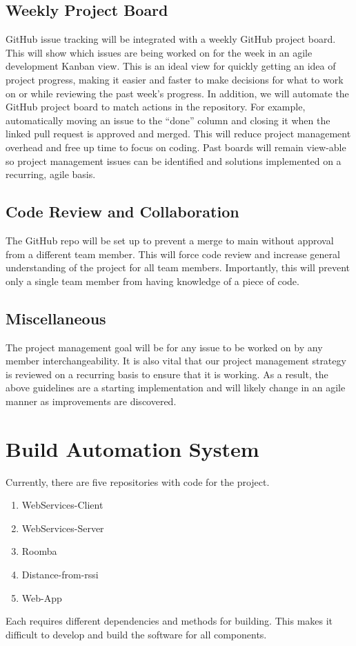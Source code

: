 \documentclass[12pt]{report}
\begin{document}
\subsection{Weekly Project Board}
GitHub issue tracking will be integrated with a weekly GitHub project board. This will show which issues are being worked on for the week in an agile development Kanban view. This is an ideal view for quickly getting an idea of project progress, making it easier and faster to make decisions for what to work on or while reviewing the past week's progress. In addition, we will automate the GitHub project board to match actions in the repository. For example, automatically moving an issue to the “done” column and closing it when the linked pull request is approved and merged. This will reduce project management overhead and free up time to focus on coding. Past boards will remain view-able so project management issues can be identified and solutions implemented on a recurring, agile basis.
\subsection{Code Review and Collaboration}
The GitHub repo will be set up to prevent a merge to main without approval from a different team member. This will force code review and increase general understanding of the project for all team members. Importantly, this will prevent only a single team member from having knowledge of a piece of code.
\subsection{Miscellaneous}
The project management goal will be for any issue to be worked on by any member interchangeability. It is also vital that our project management strategy is reviewed on a recurring basis to ensure that it is working. As a result, the above guidelines are a starting implementation and will likely change in an agile manner as improvements are discovered.


\section{Build Automation System}

Currently, there are five repositories with code for the project.
\begin{enumerate}
\itemsep0em 
\item WebServices-Client
\item WebServices-Server
\item Roomba
\item Distance-from-rssi
\item Web-App
\end{enumerate}
Each requires different dependencies and methods for building. This makes it difficult to develop
and build the software for all components.
\end{document}
